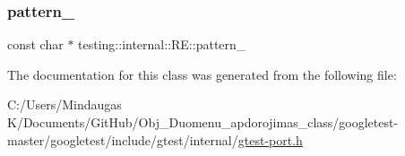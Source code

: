\subsubsection{\texorpdfstring{pattern\_}{pattern\_}}
{\footnotesize\ttfamily const char $\ast$ testing\+::internal\+::\+R\+E\+::pattern\+\_\+\hspace{0.3cm}{\ttfamily [private]}}



The documentation for this class was generated from the following file\+:\begin{DoxyCompactItemize}
\item 
C\+:/\+Users/\+Mindaugas K/\+Documents/\+Git\+Hub/\+Obj\+\_\+\+Duomenu\+\_\+apdorojimas\+\_\+class/googletest-\/master/googletest/include/gtest/internal/\mbox{\hyperlink{googletest-master_2googletest_2include_2gtest_2internal_2gtest-port_8h}{gtest-\/port.\+h}}\end{DoxyCompactItemize}
